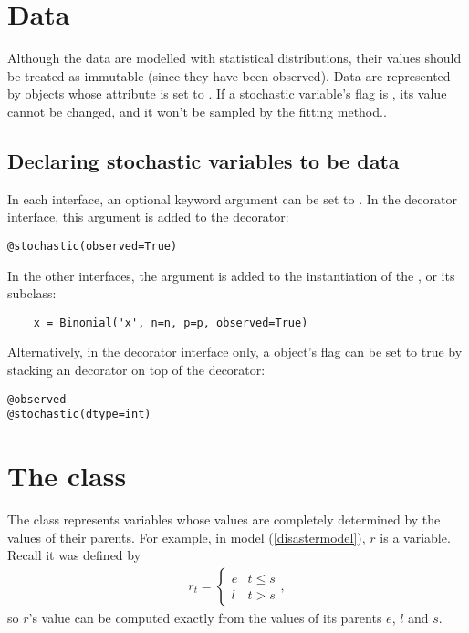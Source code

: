 \hypertarget{data}{}
\section{Data} \label{data}

Although the data are modelled with statistical distributions, their values should be treated as immutable (since they have been observed). Data are represented by  objects whose  attribute is set to . If a stochastic variable's  flag is , its value cannot be changed, and it won't be sampled by the fitting method..

\subsection{Declaring stochastic variables to be data}

In each interface, an optional keyword argument  can be set to . In the decorator interface, this argument is added to the  decorator:

\begin{verbatim}
@stochastic(observed=True)
\end{verbatim}

In the other interfaces, the  argument is added to the instantiation of the , or its subclass:

\begin{verbatim}
	x = Binomial('x', n=n, p=p, observed=True)
\end{verbatim}

Alternatively, in the decorator interface only, a  object's  flag can be set to true by stacking an  decorator on top of the  decorator:
\begin{verbatim}
@observed
@stochastic(dtype=int)
\end{verbatim}

\hypertarget{deterministic}{}
\section[The Deterministic class]{The  class}
\label{deterministic}

The  class represents variables whose values are completely determined by the values of their parents. For example, in model (\ref{disastermodel}), $r$ is a  variable. Recall it was defined by
\begin{eqnarray*}
    r_t=\left\{\begin{array}{ll}
        e & t\le s\\ l & t>s
        \end{array}\right.,
\end{eqnarray*}
so $r$'s value can be computed exactly from the values of its parents $e$, $l$ and $s$.

